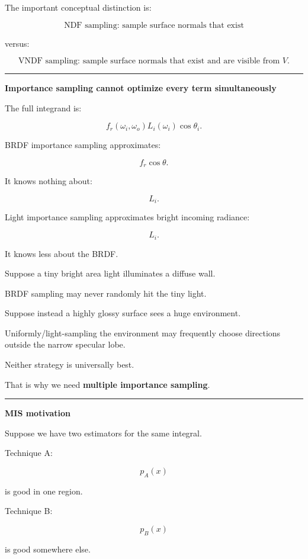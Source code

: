 The important conceptual distinction is:

\[
\boxed{
\text{NDF sampling: sample surface normals that exist}
}
\]

versus:

\[
\boxed{
\text{VNDF sampling: sample surface normals that exist and are visible from }V.
}
\]

\begin{center}\rule{0.5\linewidth}{0.5pt}\end{center}

\textbf{Importance sampling cannot optimize every term simultaneously}

The full integrand is:

\[
f_r(\omega_i,\omega_o)
L_i(\omega_i)
\cos\theta_i.
\]

BRDF importance sampling approximates:

\[
f_r\cos\theta.
\]

It knows nothing about:

\[
L_i.
\]

Light importance sampling approximates bright incoming radiance:

\[
L_i.
\]

It knows less about the BRDF.

Suppose a tiny bright area light illuminates a diffuse wall.

BRDF sampling may never randomly hit the tiny light.

Suppose instead a highly glossy surface sees a huge environment.

Uniformly/light-sampling the environment may frequently choose directions outside the narrow specular lobe.

Neither strategy is universally best.

That is why we need \textbf{multiple importance sampling}.

\begin{center}\rule{0.5\linewidth}{0.5pt}\end{center}

\textbf{MIS motivation}

Suppose we have two estimators for the same integral.

Technique A:

\[
p_A(x)
\]

is good in one region.

Technique B:

\[
p_B(x)
\]

is good somewhere else.

